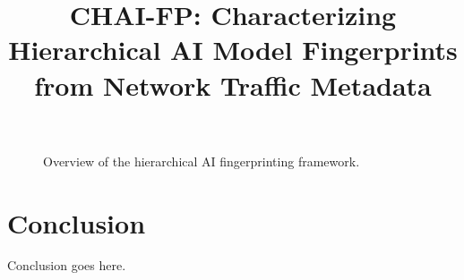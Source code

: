 \documentclass[conference]{IEEEtran}
\begin{document}
\title{CHAI-FP: Characterizing Hierarchical AI Model Fingerprints from Network Traffic Metadata}
\author{}
\maketitle


\begin{figure}[!t]
\centering
{}
\caption{Overview of the hierarchical AI fingerprinting framework.}
\label{fig:architecture}
\end{figure}





\section{Conclusion}
\label{sec:conclusion}
Conclusion goes here.
\end{document}
